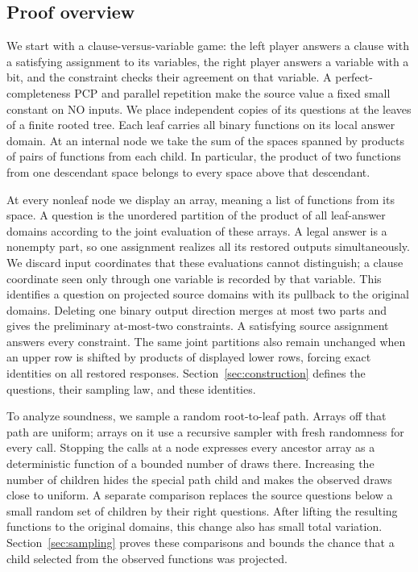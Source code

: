 \subsection{Proof overview}

We start with a clause-versus-variable game: the left player answers a
clause with a satisfying assignment to its variables, the right player
answers a variable with a bit, and the constraint checks their agreement
on that variable.  A perfect-completeness PCP and parallel repetition
make the source value a fixed small constant on NO inputs.  We place
independent copies of its questions at the leaves of a finite rooted tree.
Each leaf carries all binary functions on its local answer domain.
At an internal node we take the sum of the spaces spanned by products of
pairs of functions from each child.  In particular, the product of two functions from one descendant space
belongs to every space above that descendant.

At every nonleaf node we display an array, meaning a list of functions
from its space.  A question is the unordered partition of the product of
all leaf-answer domains according to the joint evaluation of these arrays.
A legal answer is a nonempty part, so one assignment realizes all its
restored outputs simultaneously.  We discard input coordinates that these
evaluations cannot distinguish; a clause coordinate seen only through one
variable is recorded by that variable.  This identifies a question on
projected source domains with its pullback to the original domains.
Deleting one binary output direction merges at most two parts and gives
the preliminary at-most-two constraints.  A satisfying source assignment
answers every constraint.  The same joint partitions also remain unchanged
when an upper row is shifted by products of displayed lower rows, forcing
exact identities on all restored responses.  Section~\ref{sec:construction}
defines the questions, their sampling law, and these identities.

To analyze soundness, we sample a random root-to-leaf path.  Arrays off
that path are uniform; arrays on it use a recursive sampler with fresh
randomness for every call.  Stopping the calls at a node expresses every
ancestor array as a deterministic function of a bounded number of draws
there.  Increasing the number of children hides the special path child
and makes the observed draws close to uniform.  A separate comparison
replaces the source questions below a small random set of children by
their right questions.  After lifting the resulting functions to the
original domains, this change also has small total variation.
Section~\ref{sec:sampling} proves these comparisons and bounds the chance
that a child selected from the observed functions was projected.

